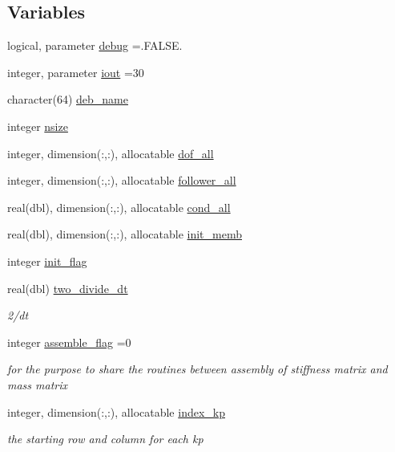 \subsection*{Variables}
\begin{DoxyCompactItemize}
\item 
logical, parameter \hyperlink{namespaceinternaldata_a0c3051eb2c273aad5bebc55fd79236ea}{debug} =.F\+A\+L\+S\+E.
\item 
integer, parameter \hyperlink{namespaceinternaldata_a82858bed9f1804b4d9d545add41703b8}{iout} =30
\item 
character(64) \hyperlink{namespaceinternaldata_abe3cfd1606a2a73e5e71421a1abc89dd}{deb\+\_\+name}
\item 
integer \hyperlink{namespaceinternaldata_a870ff06e13dc622293c20b2cc20641b9}{nsize}
\item 
integer, dimension(\+:,\+:), allocatable \hyperlink{namespaceinternaldata_a64b1e517fcf8a25bce3446ec324a4698}{dof\+\_\+all}
\item 
integer, dimension(\+:,\+:), allocatable \hyperlink{namespaceinternaldata_a2037100926e06d16be5b80c12d0c36e9}{follower\+\_\+all}
\item 
real(dbl), dimension(\+:,\+:), allocatable \hyperlink{namespaceinternaldata_aeb804e680e34df79573f79272474bd2c}{cond\+\_\+all}
\item 
real(dbl), dimension(\+:,\+:), allocatable \hyperlink{namespaceinternaldata_a187a3d4ecc99e732bd15234944dae732}{init\+\_\+memb}
\item 
integer \hyperlink{namespaceinternaldata_accc2e120df220e17a9e2b6cc72e42793}{init\+\_\+flag}
\item 
real(dbl) \hyperlink{namespaceinternaldata_a6c7ccd03dc69209443b0d6756c26f43a}{two\+\_\+divide\+\_\+dt}
\begin{DoxyCompactList}\small\item\em 2/dt \end{DoxyCompactList}\item 
integer \hyperlink{namespaceinternaldata_ae1ae8091a874c45a6efe110578e140bc}{assemble\+\_\+flag} =0
\begin{DoxyCompactList}\small\item\em for the purpose to share the routines between assembly of stiffness matrix and mass matrix \end{DoxyCompactList}\item 
integer, dimension(\+:,\+:), allocatable \hyperlink{namespaceinternaldata_af8b2fe1b76c22e0b7ae0cb514d52b04f}{index\+\_\+kp}
\begin{DoxyCompactList}\small\item\em the starting row and column for each kp \end{DoxyCompactList}\item 

\end{DoxyCompactItemize}
